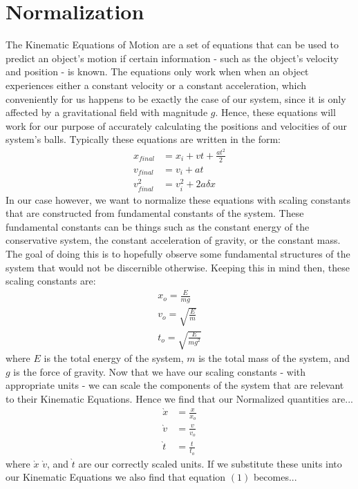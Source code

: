 \documentclass[twocolumn]{article}
\begin{document}
\section{Normalization}
\hspace{\parindent} The Kinematic Equations of Motion are a set of equations that can be used to predict an object's motion if certain information - such as the object's velocity and position - is known. The equations only work when when an object experiences either a constant velocity or a constant acceleration, which conveniently for us happens to be exactly the case of our system, since it is only affected by a gravitational field with magnitude $g$. Hence, these equations will work for our purpose of accurately calculating the positions and velocities of our system's balls. Typically these equations are written in the form:
\begin{align}
	x_{final} &= x_i + vt + \frac{at^{2}}{2} \\
	v_{final} &= v_i + at \\
	v_{final}^{2} &= v_i^{2} + 2a\delta x
\end{align}
In our case however, we want to normalize these equations with scaling constants that are constructed from fundamental constants of the system. These fundamental constants can be things such as the constant energy of the conservative system, the constant acceleration of gravity, or the constant mass. The goal of doing this is to hopefully observe some fundamental structures of the system that would not be discernible otherwise. Keeping this in mind then, these scaling constants are:
\begin{align}
	x_o = \frac{E}{mg} \\
	v_o = \sqrt{\frac{E}{m}} \\
	t_o = \sqrt{\frac{E}{mg^{2}}}
\end{align}
where $E$ is the total energy of the system, $m$ is the total mass of the system, and $g$ is the force of gravity. Now that we have our scaling constants - with appropriate units - we can scale the components of the system that are relevant to their Kinematic Equations. Hence we find that our Normalized quantities are...
\begin{align}
	\grave{x} &= \frac{x}{x_o} \\
	\grave{v} &= \frac{v}{v_o} \\
	\grave{t} &= \frac{t}{t_o}
\end{align}
where $\grave{x}$ $\grave{v}$, and $\grave{t}$ are our correctly scaled units. If we substitute these units into our Kinematic Equations we also find that equation $(1)$ becomes...
\end{document}
